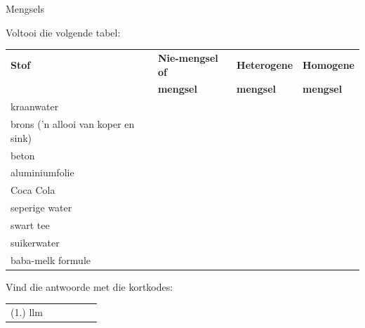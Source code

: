 \label{m38708*secfhsst!!!underscore!!!id169}
\begin{exercises}{Mengsels}
{Voltooi die volgende tabel: \par
\begin{tabular}{|l|l|l|l|}\hline
\textbf{Stof} & \textbf{Nie-mengsel of} & \textbf{Heterogene} & \textbf{Homogene} \\ 
 & \textbf{mengsel} & \textbf{mengsel} & \textbf{mengsel} \\ \hline
kraanwater & & & \\ \hline
brons ('n allooi van koper en sink) & & & \\ \hline
beton & & & \\ \hline
aluminiumfolie & & & \\ \hline
Coca Cola & & & \\ \hline
seperige water & & & \\ \hline
swart tee & & & \\ \hline
suikerwater & & & \\ \hline
baba-melk formule & & & \\ \hline
\end{tabular}
    \label{m38708*cid3}
\par {} Vind die antwoorde met die kortkodes:
 \par \begin{tabular}[h]{cccccc}
 (1.) llm  & \end{tabular} }
\end{exercises}
